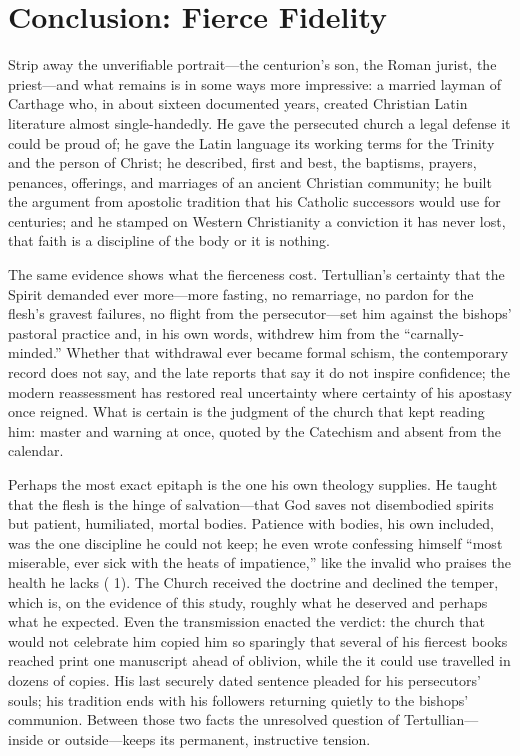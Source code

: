 \section{Conclusion: Fierce Fidelity}

Strip away the unverifiable portrait---the centurion's son, the Roman
jurist, the priest---and what remains is in some ways more impressive: a
married layman of Carthage who, in about sixteen documented years, created
Christian Latin literature almost single-handedly. He gave the persecuted
church a legal defense it could be proud of; he gave the Latin language its
working terms for the Trinity and the person of Christ; he described, first
and best, the baptisms, prayers, penances, offerings, and marriages of an
ancient Christian community; he built the argument from apostolic tradition
that his Catholic successors would use for centuries; and he stamped on
Western Christianity a conviction it has never lost, that faith is a
discipline of the body or it is nothing.

The same evidence shows what the fierceness cost. Tertullian's certainty that
the Spirit demanded ever more---more fasting, no remarriage, no pardon for the
flesh's gravest failures, no flight from the persecutor---set him against the
bishops' pastoral practice and, in his own words, withdrew him from the
``carnally-minded.'' Whether that withdrawal ever became formal schism, the
contemporary record does not say, and the late reports that say it do not
inspire confidence; the modern reassessment has restored real uncertainty
where certainty of his apostasy once reigned. What is certain is the judgment
of the church that kept reading him: master and warning at once, quoted by the
Catechism and absent from the calendar.

Perhaps the most exact epitaph is the one his own theology supplies. He taught
that the flesh is the hinge of salvation---that God saves not disembodied
spirits but patient, humiliated, mortal bodies. Patience with bodies, his own
included, was the one discipline he could not keep; he even wrote  confessing himself ``most miserable, ever sick with the heats of
impatience,'' like the invalid who praises the health he lacks ( 1). The Church received the doctrine and
declined the temper, which is, on the evidence of this study, roughly what he
deserved and perhaps what he expected. Even the transmission enacted the
verdict: the church that would not celebrate him copied him so sparingly that
several of his fiercest books reached print one manuscript ahead of oblivion,
while the  it could use travelled in dozens of copies. His last
securely dated sentence pleaded for his persecutors' souls; his tradition
ends with his followers returning quietly to the bishops' communion. Between
those two facts the unresolved question of Tertullian---inside or
outside---keeps its permanent, instructive tension.

